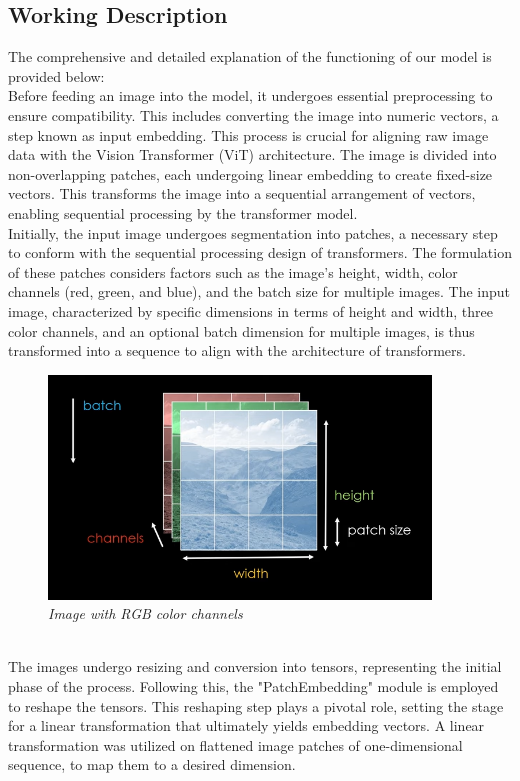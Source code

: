 \subsection{Working Description}

The comprehensive and detailed explanation of the functioning of our model is provided below:\\

Before feeding an image into the model, it undergoes essential preprocessing to ensure compatibility. This includes converting the image into numeric vectors, a step known as input embedding. This process is crucial for aligning raw image data with the Vision Transformer (ViT) architecture. The image is divided into non-overlapping patches, each undergoing linear embedding to create fixed-size vectors. This transforms the image into a sequential arrangement of vectors, enabling sequential processing by the transformer model.\\

Initially, the input image undergoes segmentation into patches, a necessary step to conform with the sequential processing design of transformers. The formulation of these patches considers factors such as the image's height, width, color channels (red, green, and blue), and the batch size for multiple images. The input image, characterized by specific dimensions in terms of height and width, three color channels, and an optional batch dimension for multiple images, is thus transformed into a sequence to align with the architecture of transformers.\\
\begin{figure}[htbp]
    \centering
    \includegraphics[width=4in]{img/colorbatch.png}
    \caption{\textit{Image with RGB color channels}}
\end{figure}\\
The images undergo resizing and conversion into tensors, representing the initial phase of the process. Following this, the "PatchEmbedding" module is employed to reshape the tensors. This reshaping step plays a pivotal role, setting the stage for a linear transformation that ultimately yields embedding vectors. A linear transformation was utilized on flattened image patches of one-dimensional sequence, to map them to a desired dimension.\\

